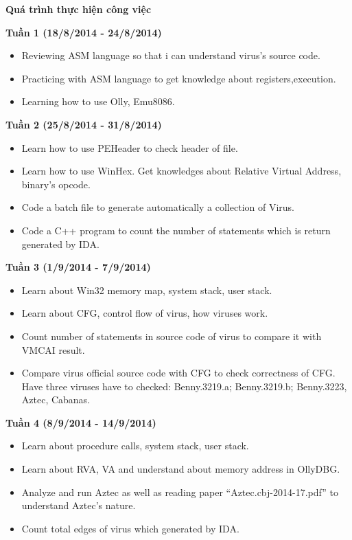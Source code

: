 \newpage
\begin{Large}
\textbf{Quá trình thực hiện công việc}
\end{Large}

\vspace{2cm}

\hspace{0.5cm}\textbf{Tuần 1 (18/8/2014 - 24/8/2014)}
\begin{itemize}
\item{Reviewing ASM language so that i can understand virus's source code.}
\item{Practicing with ASM language to get knowledge about registers,execution.}
\item{Learning how to use Olly, Emu8086.}
\end{itemize}

\hspace{0.5cm}\textbf{Tuần 2 (25/8/2014 - 31/8/2014)}
\begin{itemize}
\item{Learn how to use PEHeader to check header of file.}
\item{Learn how to use WinHex. Get knowledges about Relative Virtual Address, binary's opcode.}
\item{Code a batch file to generate automatically a collection of Virus.}
\item{Code a C++ program to count the number of statements which is return generated by IDA.}
\end{itemize}

\hspace{0.5cm}\textbf{Tuần 3 (1/9/2014 - 7/9/2014)}
\begin{itemize}
\item{Learn about Win32 memory map, system stack, user stack.}
\item{Learn about CFG, control flow of virus, how viruses work.}
\item{Count number of statements in source code of virus to compare it with VMCAI result.}
\item{Compare virus official source code with CFG to check correctness of CFG. Have three viruses have to checked: Benny.3219.a; Benny.3219.b; Benny.3223, Aztec, Cabanas.}
\end{itemize}

\hspace{0.5cm}\textbf{Tuần 4 (8/9/2014 - 14/9/2014)}
\begin{itemize}
\item{Learn about procedure calls, system stack, user stack.}
\item{Learn about RVA, VA and understand about memory address in OllyDBG.}
\item{Analyze and run Aztec as well as reading paper “Aztec.cbj-2014-17.pdf” to understand Aztec's nature.}
\item{Count total edges of virus which generated by IDA.}
\end{itemize}

